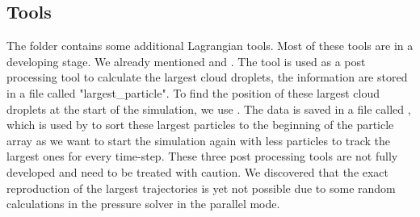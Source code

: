 \documentclass[12pt]{article}
\begin{document}
\subsection{Tools}
The folder  contains some additional Lagrangian tools. Most of these tools are in a developing stage. We already mentioned  and . \newline
The tool  is used as a post processing tool to calculate the largest cloud droplets, the information are stored in a file called "largest\_particle". To find the position of these largest cloud droplets at the start of the simulation, we use . The data is saved in a file called , which is used by  to sort these largest particles to the beginning of the particle array as we want to start the simulation again with less particles to track the largest ones for every time-step. These three post processing tools are not fully developed and need to be treated with caution. We discovered that the exact reproduction of the largest trajectories is yet not possible due to some random calculations in the pressure solver in the parallel mode.
\end{document}
